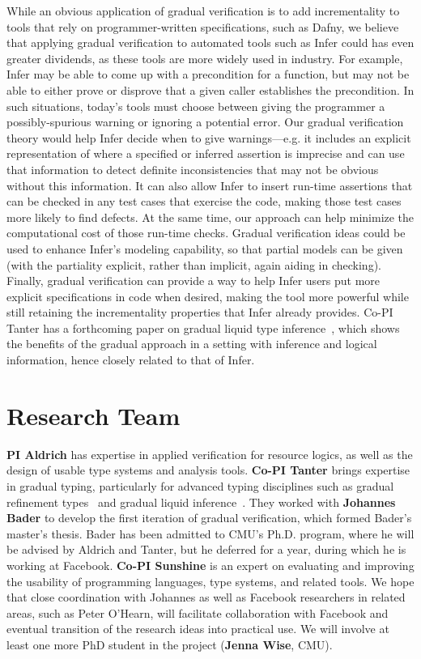 \documentclass[10pt,twocolumn]{article}
\begin{document}
\begin{sloppypar}
While an obvious application of gradual verification is to add incrementality to tools that rely on programmer-written specifications, such as Dafny, we believe that applying gradual verification to automated tools such as Infer could has even greater dividends, as these tools are more widely used in industry. For example, Infer may be able to come up with a precondition for a function, but may not be able to either prove or disprove that a given caller establishes the precondition.  In such situations, today's tools must choose between giving the programmer a possibly-spurious warning or ignoring a potential error. Our gradual verification theory would help Infer decide when to give warnings---e.g. it includes an explicit representation of where a specified or inferred assertion is imprecise and can use that information to detect definite inconsistencies that may not be obvious without this information. It can also allow Infer to insert run-time assertions that can be checked in any test cases that exercise the code, making those test cases more likely to find defects.  At the same time, our approach can help minimize the computational cost of those run-time checks. Gradual verification ideas could be used to enhance Infer's modeling capability, so that partial models can be given (with the partiality explicit, rather than implicit, again aiding in checking). Finally, gradual verification can provide a way to help Infer users put more explicit specifications in code when desired, making the tool more powerful while still retaining the incrementality properties that Infer already provides.
Co-PI Tanter has a forthcoming paper on gradual liquid type inference~\cite{vazouAl:oopsla2018}, which shows the benefits of the gradual approach in a setting with inference and logical information, hence closely related to that of Infer.

\section{Research Team}
\vspace{-2ex}

\textbf{PI Aldrich} has expertise in applied verification for resource logics, as well as the design of usable type systems and analysis tools.  \textbf{Co-PI Tanter} brings expertise in gradual typing, particularly for advanced typing disciplines such as gradual refinement types~\cite{lehmannTanter:popl2017} and gradual liquid inference~\cite{vazouAl:oopsla2018}.  They worked with \textbf{Johannes Bader} to develop the first iteration of gradual verification, which formed Bader's master's thesis.  Bader has been admitted to CMU's Ph.D. program, where he will be advised by Aldrich and Tanter, but he deferred for a year, during which he is working at Facebook.  \textbf{Co-PI Sunshine} is an expert on evaluating and improving the usability of programming languages, type systems, and related tools.  We hope that close coordination with Johannes as well as Facebook researchers in related areas, such as Peter O'Hearn, will facilitate collaboration with Facebook and eventual transition of the research ideas into practical use. We will involve at least one more PhD student in the project (\textbf{Jenna Wise}, CMU).




\end{sloppypar}
\end{document}
